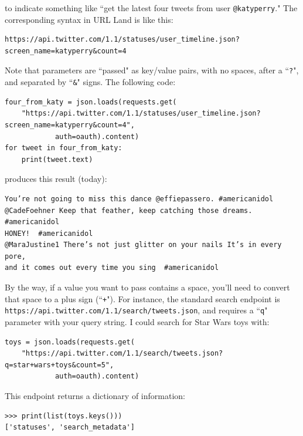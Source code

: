 \documentclass[12pt]{article}
\begin{document}
to indicate something like ``get the latest four tweets from user
\texttt{@katyperry}." The corresponding syntax in URL Land is like this:

\footnotesize
\begin{Verbatim}[fontsize=\small,samepage=true,frame=none]
https://api.twitter.com/1.1/statuses/user_timeline.json?screen_name=katyperry&count=4
\end{Verbatim}
\normalsize

Note that parameters are ``passed" as key/value pairs, with no spaces, after a
``\texttt{?}", and separated by ``\texttt{\&}" signs. The following code:

\footnotesize
\begin{Verbatim}[fontsize=\small,samepage=true,frame=none]
four_from_katy = json.loads(requests.get(
    "https://api.twitter.com/1.1/statuses/user_timeline.json?screen_name=katyperry&count=4",
            auth=oauth).content)
for tweet in four_from_katy:
    print(tweet.text)
\end{Verbatim}
\normalsize

produces this result (today):

\begin{Verbatim}[fontsize=\small,samepage=true,frame=none]
You’re not going to miss this dance @effiepassero. #americanidol
@CadeFoehner Keep that feather, keep catching those dreams. #americanidol
HONEY!  #americanidol
@MaraJustine1 There’s not just glitter on your nails It’s in every pore,
and it comes out every time you sing  #americanidol
\end{Verbatim}

By the way, if a value you want to pass contains a space, you'll need to
convert that space to a plus sign (``\texttt{+}"). For instance, the standard
search endpoint is \texttt{https://api.twitter.com/1.1/search/tweets.json},
and requires a ``\texttt{q}" parameter with your query string. I could search
for Star Wars toys with:

\small
\begin{Verbatim}[fontsize=\small,samepage=true,frame=none]
toys = json.loads(requests.get(
    "https://api.twitter.com/1.1/search/tweets.json?q=star+wars+toys&count=5",
            auth=oauth).content)
\end{Verbatim}
\normalsize

This endpoint returns a dictionary of information:

\begin{Verbatim}[fontsize=\small,samepage=true,frame=none]
>>> print(list(toys.keys()))
['statuses', 'search_metadata']
\end{Verbatim}
\end{document}
